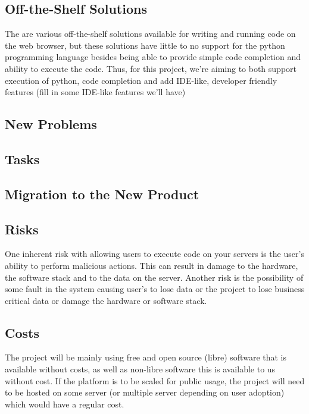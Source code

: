 \documentclass[12pt, titlepage]{article}
\begin{document}
  \subsection{Off-the-Shelf Solutions}
  The are various off-the-shelf solutions available for writing and running
  code on the web browser, but these solutions have little to no support for
  the python programming language besides being able to provide simple code
  completion and ability to execute the code. Thus, for this project, we're
  aiming to both support execution of python, code completion and add IDE-like,
  developer friendly features ({\huge fill in some IDE-like features we'll
  have})

  \subsection{New Problems}

  \subsection{Tasks}

  \subsection{Migration to the New Product}

  \subsection{Risks}
  One inherent risk with allowing users to execute code on your servers is the
  user's ability to perform malicious actions. This can result in damage to the
  hardware, the software stack and to the data on the server.  Another risk is
  the possibility of some fault in the system causing user's to lose data or
  the project to lose business critical data or damage the hardware or software
  stack.

  \subsection{Costs}
  The project will be mainly using free and open source (libre) software that
  is available without costs, as well as non-libre software this is available
  to us without cost. If the platform is to be scaled for public usage, the
  project will need to be hosted on some server (or multiple server depending
  on user adoption) which would have a regular cost.
\end{document}
